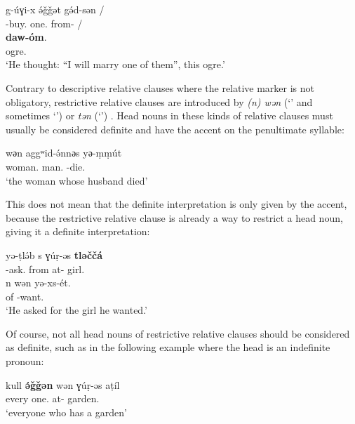 \documentclass[output=paper]{langsci/langscibook}
\begin{document}
\begin{exe}
\ex\label{5ex:32}
\gll	g-úɣi-x	ə́ǧǧət	gə́d-sən	/ \\
	{}-buy.{}	one.{}	from-{}	/ \\
\glt
\exi{}
	{\bf{daw-óm}}. \\
	ogre.{}	{} \\
\glt `He thought: ``I will marry one of them'', this ogre.'
\end{exe}

Contrary to descriptive relative clauses where the relative marker is not obligatory, restrictive relative clauses are introduced by {\emph{(n) wən}} (`{}' and sometimes `{}') or {\emph{tən}} (`{}') \citep{schiattarella:14}. Head nouns in these kinds of relative clauses must usually be considered definite and have the accent on the penultimate syllable:

\begin{exe}
\ex\label{5ex:33}
	wәn	aggʷid-ə́nnәs	yә-ṃṃút \\
	woman.{}	{}	 man.{} 	{}-die.{} \\
\glt	`the woman whose husband died'
\end{exe}

This does not mean that the definite interpretation is only given by the accent, because the restrictive relative clause is already a way to restrict a head noun, giving it a definite interpretation:

\begin{exe}
\ex\label{5ex:34}
\gll	yə-ṭlə́b	s	ɣúṛ-əs	{\bf{tləččá}} \\
	{}-ask.{}	from	at-{}	girl.{} \\
\glt
\exi{}
\gll	n	wən	yə-xs-ét. \\
	of	{}	{}-want.{} \\
\glt	`He asked for the girl he wanted.'
\end{exe}

Of course, not all head nouns of restrictive relative clauses should be considered as definite, such as in the following example where the head is an indefinite pronoun:

\begin{exe}
\ex\label{5ex:35}
\gll	kull	{\bf{ə́ǧǧən}}	wən	ɣúṛ-əs	aṭíl \\
	every	one.{}	{}	at-{}	garden.{} \\
\glt	`everyone who has a garden'
\end{exe}
\end{document}
